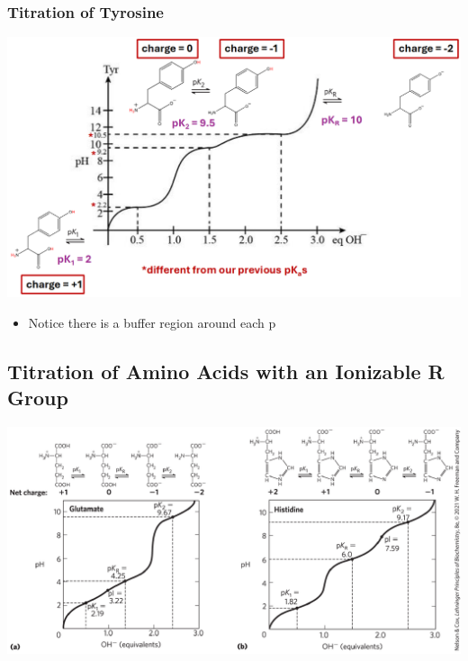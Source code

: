 \documentclass[10pt]{article}
\newcommand{\ka}{\text{$K_\text{a}$}}
\begin{document}
\subsubsection*{Titration of Tyrosine}
\begin{center}
    \includegraphics[width=\textwidth]{L2_6.png}
\end{center}
\begin{itemize}
    \item Notice there is a buffer region around each p\ka
\end{itemize}
\subsection*{Titration of Amino Acids with an Ionizable R Group}
\begin{center}
    \includegraphics[width=\textwidth]{L2_7.png}
\end{center}
\end{document}
